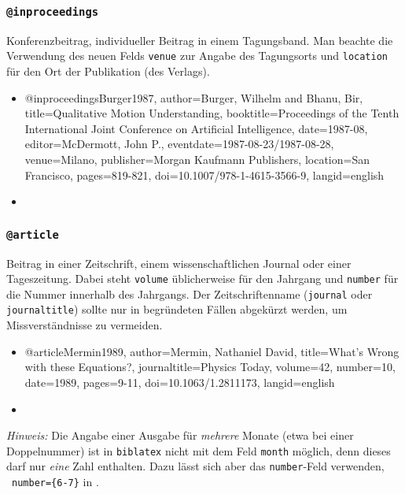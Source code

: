 
\subsubsection{\texttt{\bfseries @inproceedings}}
\label{sec:@inproceedings}

Konferenzbeitrag, individueller Beitrag in einem Tagungsband. Man beachte die
Verwendung des neuen Felds \texttt{venue} zur Angabe des Tagungsorts und
\texttt{location} für den Ort der Publikation (des Verlags).
%
\begin{itemize}
\item[]
\begin{GenericCode}[numbers=none]
@inproceedings{Burger1987,
  author={Burger, Wilhelm and Bhanu, Bir},
  title={Qualitative Motion Understanding},
  booktitle={Proceedings of the Tenth International Joint Conference on Artificial Intelligence},
  date={1987-08},
  editor={McDermott, John P.},
  eventdate={1987-08-23/1987-08-28},
  venue={Milano},
  publisher={Morgan Kaufmann Publishers},
  location={San Francisco},
  pages={819-821},
  doi={10.1007/978-1-4615-3566-9},
  langid={english}
}
\end{GenericCode}
\item[\cite{Burger1987}] 
\end{itemize}


\subsubsection{\texttt{\bfseries @article}}
\label{sec:@article}

Beitrag in einer Zeitschrift, einem wissenschaftlichen Journal oder einer
Tageszeitung. Dabei steht \texttt{volume} üblicherweise für den Jahrgang und
\texttt{number} für die Nummer innerhalb des Jahrgangs. Der Zeitschriftenname
(\texttt{journal} oder \texttt{journaltitle}) sollte nur in begründeten Fällen
abgekürzt werden, um Missverständnisse zu vermeiden.
%
\begin{itemize}
\item[]
\begin{GenericCode}[numbers=none]
@article{Mermin1989,
  author={Mermin, Nathaniel David},
  title={What's Wrong with these Equations?},
  journaltitle={Physics Today},
  volume={42},
  number={10},
  date={1989},
  pages={9-11},
  doi={10.1063/1.2811173},
  langid={english}
}
\end{GenericCode}
\item[\cite{Mermin1989}] 
\end{itemize}
%
\emph{Hinweis:} Die Angabe einer Ausgabe für \emph{mehrere} Monate (etwa bei
einer Doppelnummer) ist in \texttt{biblatex} nicht mit dem Feld
\texttt{month} möglich, denn dieses darf nur \emph{eine} Zahl enthalten. Dazu
lässt sich aber das \texttt{number}-Feld verwenden, \zB\
\texttt{number=\{6-7\}} in \cite{Vardavoulia2001}.

